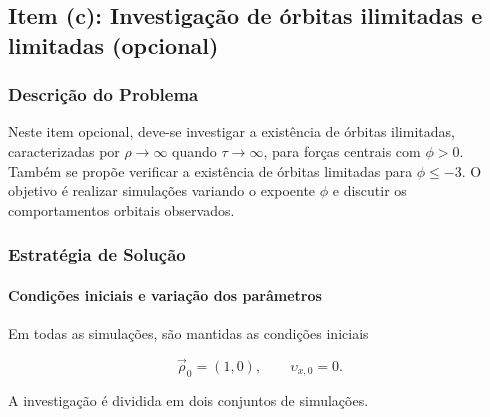 \documentclass[12pt,a4paper]{article}
\begin{document}
\subsection{Item (c): Investigação de órbitas ilimitadas e limitadas (opcional)}

\subsubsection{Descrição do Problema}

Neste item opcional, deve-se investigar a existência de órbitas ilimitadas, caracterizadas por $\rho\rightarrow\infty$ quando $\tau\rightarrow\infty$, para forças centrais com $\phi>0$. Também se propõe verificar a existência de órbitas limitadas para $\phi\leq -3$. O objetivo é realizar simulações variando o expoente $\phi$ e discutir os comportamentos orbitais observados.

\subsubsection{Estratégia de Solução}

\paragraph{Condições iniciais e variação dos parâmetros}

Em todas as simulações, são mantidas as condições iniciais

\begin{equation}
    \vec{\rho}_0=(1,0),
    \qquad
    \upsilon_{x,0}=0.
\end{equation}

A investigação é dividida em dois conjuntos de simulações.
\end{document}
